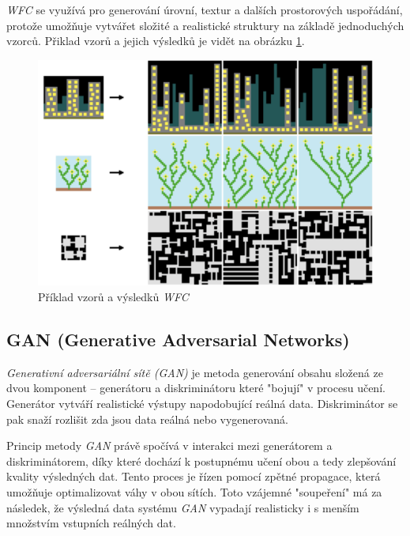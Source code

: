 \textit{WFC} se využívá pro generování úrovní, textur a dalších prostorových uspořádání, protože umožňuje vytvářet složité a realistické struktury na základě jednoduchých vzorců. Přiklad vzorů a jejich výsledků je vidět na obrázku \ref{WFC_priklad}. \cite{waveClanek}

\begin{figure}
  \centering      %
  \includegraphics[scale=0.6]{obr/wfc-examples.png} %
  \caption{Příklad vzorů a výsledků \textit{WFC} \cite{waveClanek}} %
  \label{WFC_priklad} %
\end{figure}

\subsection{GAN (Generative Adversarial Networks)}

\textit{Generativní adversariální sítě (GAN)} je metoda generování obsahu složená ze dvou komponent -- generátoru a diskriminátoru které "bojují" v procesu učení. Generátor vytváří realistické výstupy napodobující reálná data. Diskriminátor se pak snaží rozlišit zda jsou data reálná nebo vygenerovaná.

Princip metody \textit{GAN} právě spočívá v interakci mezi generátorem a diskriminátorem, díky které dochází k postupnému učení obou a tedy zlepšování kvality výsledných dat. Tento proces je řízen pomocí zpětné propagace, která umožňuje optimalizovat váhy v obou sítích. Toto vzájemné "soupeření" má za následek, že výsledná data systému \textit{GAN} vypadají realisticky i s menším množstvím vstupních reálných dat.

